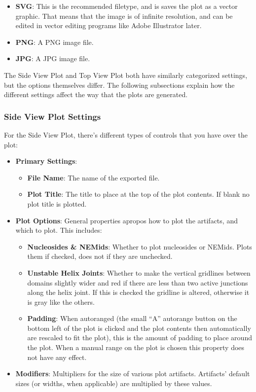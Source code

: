 \documentclass[titlepage]{article}
\begin{document}
\begin{itemize}
	\item \textbf{SVG}: This is the recommended filetype, and is saves the plot as a vector graphic. That means that the image is of infinite resolution, and can be edited in vector editing programs like Adobe Illustrator later.
	\item \textbf{PNG}: A PNG image file.
	\item \textbf{JPG}: A JPG image file.  
\end{itemize}

The Side View Plot and Top View Plot both have similarly categorized settings, but the options themselves differ. The following subsections explain how the different settings affect the way that the plots are generated.

\subsubsection{Side View Plot Settings}

For the Side View Plot, there's different types of controls that you have over the plot:

\begin{itemize}
	\item \textbf{Primary Settings}: 
	\begin{itemize}
		\item \textbf{File Name}: The name of the exported file.
		\item \textbf{Plot Title}: The title to place at the top of the plot contents. If blank no plot title is plotted.
	\end{itemize}
	
	\item \textbf{Plot Options}: General properties apropos how to plot the artifacts, and which to plot. This includes:
	\begin{itemize}
		\item \textbf{Nucleosides \& NEMids}: Whether to plot nucleosides or NEMids. Plots them if checked, does not if they are unchecked.
		
		\item \textbf{Unstable Helix Joints}: Whether to make the vertical gridlines between domains slightly wider and red if there are less than two active junctions along the helix joint. If this is checked the gridline is altered, otherwise it is gray like the others.
		
		\item \textbf{Padding}: When autoranged (the small ``A'' autorange button on the bottom left of the plot is clicked and the plot contents then automatically are rescaled to fit the plot), this is the amount of padding to place around the plot. When a manual range on the plot is chosen this property does not have any effect.
	\end{itemize}
	
	\item \textbf{Modifiers}: Multipliers for the size of various plot artifacts. Artifacts' default sizes (or widths, when applicable) are multiplied by these values.
\end{itemize}
\end{document}
